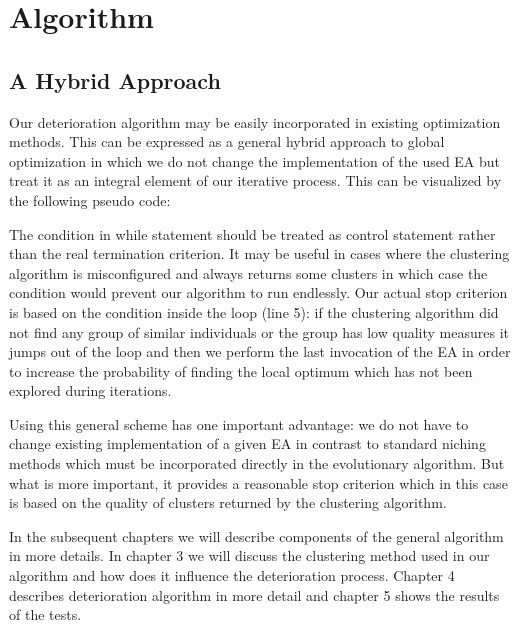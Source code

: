 
\chapter{Algorithm}
\label{Algorithm}

\section{A Hybrid Approach}

Our deterioration algorithm may be easily incorporated in existing optimization
methods. This can be expressed as a general hybrid approach to global
optimization in which we do not change the implementation of the used EA
but treat it as an integral element of our iterative process.
This can be visualized by the following pseudo code:




\begin{algorithmic}[1]
	\ENDIF
\ENDWHILE
{}
\end{algorithmic}




The condition in while statement should be treated as control statement rather
than the real termination criterion. It may be useful in cases where the
clustering algorithm is misconfigured and always returns some clusters in which
case the condition would prevent our algorithm to run endlessly.
Our actual stop criterion is based on the condition inside the loop (line 5): if the clustering algorithm did not find any group of similar individuals or the group has low quality measures it jumps out
of the loop and then we perform the last invocation of the EA in order to
increase the probability of finding the local optimum which has not been explored during iterations.

Using this general scheme has one important advantage: we do not have to change
existing implementation of a given EA in contrast to standard niching
methods which must be incorporated directly in the evolutionary algorithm. But
what is more important, it provides a reasonable stop criterion which in this case is based 
on the quality of clusters returned by the clustering algorithm.
 
In the subsequent chapters we will describe components  of the general
algorithm in more details.
In chapter 3 we will discuss the clustering method used in our algorithm and 
how does it influence the deterioration process. Chapter 4 describes
deterioration algorithm in more detail and chapter 5 shows the results 
of the tests.

